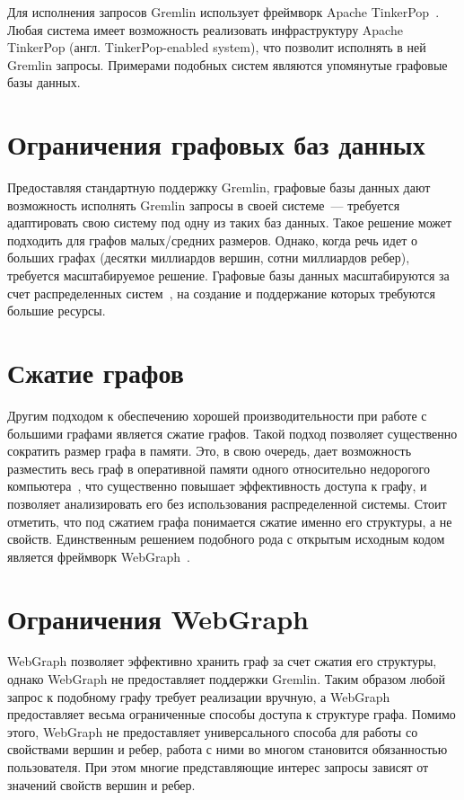 \documentclass[times,specification,annotation]{itmo-student-thesis}
\begin{document}
Для исполнения запросов Gremlin использует фреймворк Apache TinkerPop~\cite{tinkerpop}. Любая система имеет возможность реализовать инфраструктуру Apache TinkerPop (англ. TinkerPop-enabled system), что позволит исполнять в ней Gremlin запросы. Примерами подобных систем являются упомянутые графовые базы данных.

\section{Ограничения графовых баз данных}

Предоставляя стандартную поддержку Gremlin, графовые базы данных дают возможность исполнять Gremlin запросы в своей системе~--- требуется адаптировать свою систему под одну из таких баз данных. Такое решение может подходить для графов малых/средних размеров. Однако, когда речь идет о больших графах (десятки миллиардов вершин, сотни миллиардов ребер), требуется масштабируемое решение. Графовые базы данных масштабируются за счет распределенных систем~\cite{graph-db-scale, swh-antoine}, на создание и поддержание которых требуются большие ресурсы.

\section{Сжатие графов}

Другим подходом к обеспечению хорошей производительности при работе с большими графами является сжатие графов. Такой подход позволяет существенно сократить размер графа в памяти. Это, в свою очередь, дает возможность разместить весь граф в оперативной памяти одного относительно недорогого компьютера~\cite{saner}, что существенно повышает эффективность доступа к графу, и позволяет анализировать его без использования распределенной системы. Стоит отметить, что под сжатием графа понимается сжатие именно его структуры, а не свойств. Единственным решением подобного рода с открытым исходным кодом является фреймворк WebGraph~\cite{webgraph}.

\section{Ограничения WebGraph}\label{sec:web-lim}

WebGraph позволяет эффективно хранить граф за счет сжатия его структуры, однако WebGraph не предоставляет поддержки Gremlin. Таким образом любой запрос к подобному графу требует реализации вручную, а WebGraph предоставляет весьма ограниченные способы доступа к структуре графа.
Помимо этого, WebGraph не предоставляет универсального способа для работы со свойствами вершин и ребер, работа с ними во многом становится обязанностью пользователя. При этом многие представляющие интерес запросы зависят от значений свойств вершин и ребер.
\end{document}
